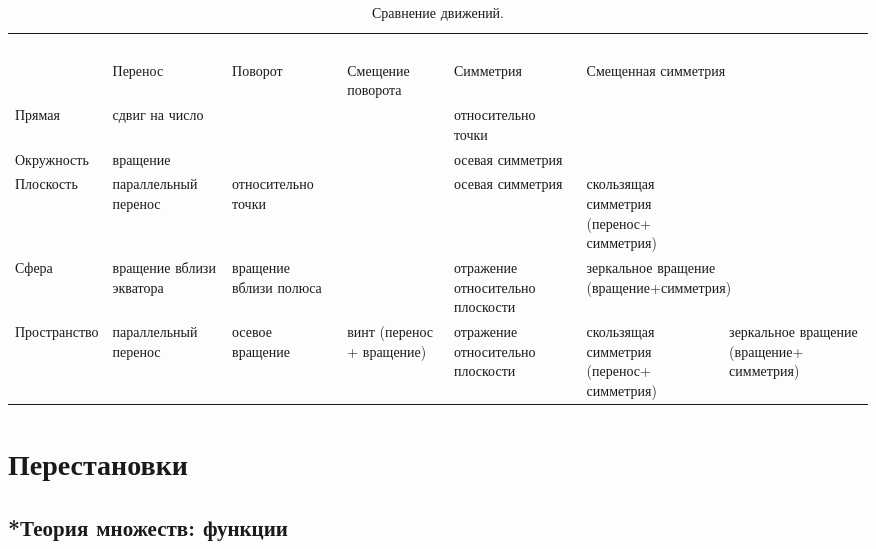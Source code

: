 \begin{table}
\caption{Сравнение движений.}
\label{Transitions}
\begin{tabular}{p{2cm}|p{2.5cm}p{2.5cm}p{2.5cm}p{2cm}p{2.5cm}p{2.5cm}}
\rowcolor{darkred}
& \multicolumn{3}{P{8.5cm}}{\textcolor{white}{\bfseries Собственные движения\linebreak (не меняют ориентацию)}} & \multicolumn{3}{P{8cm}}{\textcolor{white}{\bfseries Несобственные движения\linebreak (меняют ориентацию)}} \\ 
& Перенос & Поворот & Смещение поворота & Симметрия & \multicolumn{2}{p{5cm}}{Смещенная симметрия} \\ \hline \hline
Прямая     & сдвиг на число & & & относи\-тель\-но точки & & \\  \hline
Окруж\-ность & \multicolumn{2}{p{5cm}}{\centerline{вращение}} & & осевая симметрия & & \\ \hline
Плос\-кость  & параллель\-ный перенос & относи\-тель\-но точки & & осевая симметрия & скользящая симметрия (перенос+ сим\-мет\-рия) & \\  \hline
Сфера & вращение вблизи экватора & вращение вблизи полюса & & отражение относительно плоскости & \multicolumn{2}{p{5cm}}{зеркальное вращение (вращение+симметрия)} \\ \hline
Прост\-ранство & параллель\-ный перенос & осевое вращение & винт (перенос + вращение) & отражение относительно плоскости & скользящая симметрия (перенос+ сим\-мет\-рия) & зеркальное вращение (вращение+ сим\-мет\-рия) \\ \hline \hline
\end{tabular}
\end{table}








\chapter{Перестановки}



\section{*Теория множеств: функции}\label{functions}

